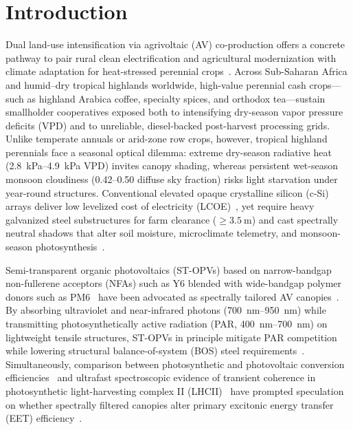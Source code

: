 \documentclass[preprint,12pt,a4paper]{elsarticle}
\begin{document}
\section{Introduction}
\label{sec:intro}

Dual land-use intensification via agrivoltaic (AV) co-production offers a concrete pathway to pair rural clean electrification and agricultural modernization with climate adaptation for heat-stressed perennial crops~\cite{Dupraz2011,BarronGafford2019,FAO2022,Asaa2024}. Across Sub-Saharan Africa and humid--dry tropical highlands worldwide, high-value perennial cash crops---such as highland Arabica coffee, specialty spices, and orthodox tea---sustain smallholder cooperatives exposed both to intensifying dry-season vapor pressure deficits (VPD) and to unreliable, diesel-backed post-harvest processing grids. Unlike temperate annuals or arid-zone row crops, however, tropical highland perennials face a seasonal optical dilemma: extreme dry-season radiative heat (\qtyrange{2.8}{4.9}{\kilo\pascal} VPD) invites canopy shading, whereas persistent wet-season monsoon cloudiness (\numrange{0.42}{0.50} diffuse sky fraction) risks light starvation under year-round structures. Conventional elevated opaque crystalline silicon (c-Si) arrays deliver low levelized cost of electricity (LCOE)~\cite{Amaducci2018,Zidane2025}, yet require heavy galvanized steel substructures for farm clearance ($\ge\qty{3.5}{\meter}$) and cast spectrally neutral shadows that alter soil moisture, microclimate telemetry, and monsoon-season photosynthesis~\cite{Marrou2013,Elamri2018,MaLu2022,Zainali2025}.

Semi-transparent organic photovoltaics (ST-OPVs) based on narrow-bandgap non-fullerene acceptors (NFAs) such as Y6 blended with wide-bandgap polymer donors such as PM6~\cite{Lunt2011,Yuan2019,Shen2025NatCommun} have been advocated as spectrally tailored AV canopies~\cite{Ravishankar2020,Thompson2020}. By absorbing ultraviolet and near-infrared photons (\qtyrange{700}{950}{\nano\meter}) while transmitting photosynthetically active radiation (PAR, \qtyrange{400}{700}{\nano\meter}) on lightweight tensile structures, ST-OPVs in principle mitigate PAR competition while lowering structural balance-of-system (BOS) steel requirements~\cite{Machui2014,Ravilla2024}. Simultaneously, comparison between photosynthetic and photovoltaic conversion efficiencies~\cite{Blankenship2011} and ultrafast spectroscopic evidence of transient coherence in photosynthetic light-harvesting complex II (LHCII)~\cite{Collini2010,Novoderezhkin2011,Huelga2013,Scholes2015,TeguiaKouam2026} have prompted speculation on whether spectrally filtered canopies alter primary excitonic energy transfer (EET) efficiency~\cite{Kassal2013,Kim2025SciAdv}.
\end{document}
